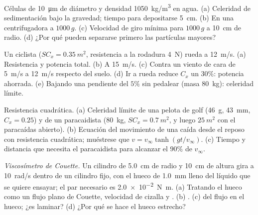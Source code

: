 \begin{exercise}[$\star\star$]\label{exo:b2:viscous-flows:6}
Células de \qty{10}{\micro m} de diámetro y densidad \qty{1050}{kg/m^3} en agua.
(a) Celeridad de sedimentación bajo la gravedad; tiempo para depositarse \qty{5}{cm}. (b) En
una centrifugadora a $1000\,g$. (c) Velocidad de giro mínima para $1000\,g$ a
\qty{10}{cm} de radio. (d) ¿Por qué pueden separarse primero las partículas mayores?
\end{exercise}

\begin{exercise}[$\star\star$]\label{exo:b2:viscous-flows:7}
Un ciclista ($SC_x = \qty{0.35}{m^2}$, resistencia a la rodadura \qty{4}{N}) rueda a
\qty{12}{m/s}. (a) Resistencia y potencia total. (b) A \qty{15}{m/s}. (c) Contra un
viento de cara de \qty{5}{m/s} a \qty{12}{m/s} respecto del suelo. (d) Ir a rueda reduce
$C_x$ un $30\%$: potencia ahorrada. (e) Bajando una pendiente del $5\%$ sin pedalear
(masa \qty{80}{kg}): celeridad límite.
\end{exercise}

\begin{exercise}[$\star\star$]\label{exo:b2:viscous-flows:8}
Resistencia cuadrática. (a) Celeridad límite de una pelota de golf (\qty{46}{g}, \qty{43}{mm},
$C_x = 0.25$) y de un paracaidista (\qty{80}{kg}, $SC_x = \qty{0.7}{m^2}$, y luego
$\qty{25}{m^2}$ con el paracaídas abierto). (b) Ecuación del movimiento de una caída
desde el reposo con resistencia cuadrática; muéstrese que $v = v_\infty\tanh(gt/v_\infty)$. (c)
Tiempo y distancia que necesita el paracaidista para alcanzar el $90\%$ de $v_\infty$.
\end{exercise}

\begin{exercise}[$\star\star$]\label{exo:b2:viscous-flows:9}
\emph{Viscosímetro de Couette.} Un cilindro de \qty{5.0}{cm} de radio y
\qty{10}{cm} de altura gira a \qty{10}{rad/s} dentro de un cilindro fijo,
con el hueco de \qty{1.0}{mm} lleno del líquido que se quiere ensayar; el
par necesario es \qty{2.0e-2}{N.m}. (a) Tratando el hueco como un flujo
plano de Couette, velocidad de cizalla y . (b) . (c)  del flujo en el hueco;
¿es laminar? (d) ¿Por qué se hace el hueco estrecho?
\end{exercise}

